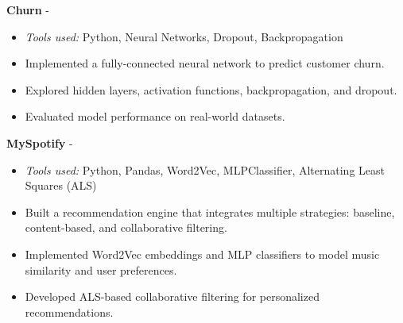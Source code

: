 \documentclass[a4paper,11pt]{article}%
\begin{document}
%
\noindent \textbf{Churn} - \href{https://github.com/sboof911/churn}{{}}%
\begin{itemize}[leftmargin=2em,label={},parsep=0pt,topsep=1em]%
\item \textit{Tools used:} Python, Neural Networks, Dropout, Backpropagation%
\item Implemented a fully-connected neural network to predict customer churn.%
\item Explored hidden layers, activation functions, backpropagation, and dropout.%
\item Evaluated model performance on real-world datasets.%
\end{itemize}%
%
\noindent \textbf{MySpotify} - \href{https://github.com/sboof911/MySpotify}{{}}%
\begin{itemize}[leftmargin=2em,label={},parsep=0pt,topsep=1em]%
\item \textit{Tools used:} Python, Pandas, Word2Vec, MLPClassifier, Alternating Least Squares (ALS)%
\item Built a recommendation engine that integrates multiple strategies: baseline, content-based, and collaborative filtering.%
\item Implemented Word2Vec embeddings and MLP classifiers to model music similarity and user preferences.%
\item Developed ALS-based collaborative filtering for personalized recommendations.%
\end{itemize}%
\end{document}
